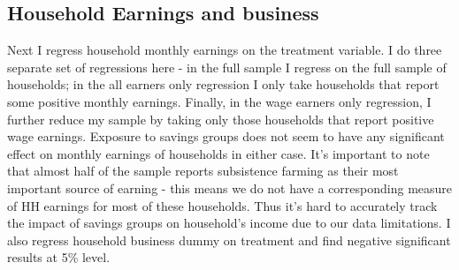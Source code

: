 \documentclass[12pt]{article}
\begin{document}
{\subsection*{Household Earnings and business}\label{sec:regression earnings}

\hspace{1cm} Next I regress household monthly earnings on the treatment variable. I do three separate set of regressions here - in the full sample I regress on the full sample of households; in the all earners only regression I only take households that report some positive monthly earnings. Finally, in the wage earners only regression, I further reduce my sample by taking only those households that report positive wage earnings. Exposure to savings groups does not seem to have any significant effect on monthly earnings of households in either case. It's important to note that almost half of the sample reports subsistence farming as their most important source of earning - this means we do not have a corresponding measure of HH earnings for most of these households. Thus it's hard to accurately track the impact of savings groups on household's income due to our data limitations. I also regress household business dummy on treatment and find negative significant results at 5\% level.

}
\end{document}
